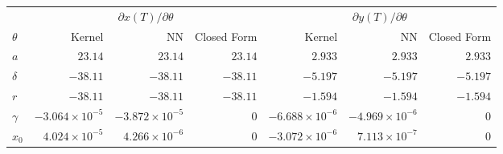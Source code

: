 \begin{tabular}{lrrrrrr}
\toprule
 & \multicolumn{3}{c}{$\partial x(T)/\partial \theta$} & \multicolumn{3}{c}{$\partial y(T)/\partial \theta$} \\
\cmidrule(lr){2-4}\cmidrule(lr){5-7}
$\theta$ & Kernel & NN & Closed Form & Kernel & NN & Closed Form \\
\midrule
$a$ & $23.14$ & $23.14$ & $23.14$ & $2.933$ & $2.933$ & $2.933$ \\
$\delta$ & $-38.11$ & $-38.11$ & $-38.11$ & $-5.197$ & $-5.197$ & $-5.197$ \\
$r$ & $-38.11$ & $-38.11$ & $-38.11$ & $-1.594$ & $-1.594$ & $-1.594$ \\
$\gamma$ & $-3.064 \times 10^{-5}$ & $-3.872 \times 10^{-5}$ & $0$ & $-6.688 \times 10^{-6}$ & $-4.969 \times 10^{-6}$ & $0$ \\
$x_0$ & $4.024 \times 10^{-5}$ & $4.266 \times 10^{-6}$ & $0$ & $-3.072 \times 10^{-6}$ & $7.113 \times 10^{-7}$ & $0$ \\
\bottomrule
\end{tabular}
